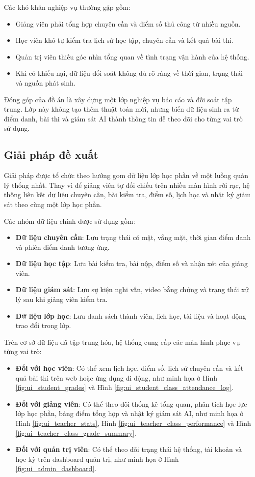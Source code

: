 \documentclass[../DoAn.tex]{subfiles}
\begin{document}
Các khó khăn nghiệp vụ thường gặp gồm:
\begin{itemize}
    \item Giảng viên phải tổng hợp chuyên cần và điểm số thủ công từ nhiều nguồn.
    \item Học viên khó tự kiểm tra lịch sử học tập, chuyên cần và kết quả bài thi.
    \item Quản trị viên thiếu góc nhìn tổng quan về tình trạng vận hành của hệ thống.
    \item Khi có khiếu nại, dữ liệu đối soát không đủ rõ ràng về thời gian, trạng thái và nguồn phát sinh.
\end{itemize}

Đóng góp của đồ án là xây dựng một lớp nghiệp vụ báo cáo và đối soát tập trung. Lớp này không tạo thêm thuật toán mới, nhưng biến dữ liệu sinh ra từ điểm danh, bài thi và giám sát AI thành thông tin dễ theo dõi cho từng vai trò sử dụng.

\subsection{Giải pháp đề xuất}
Giải pháp được tổ chức theo hướng gom dữ liệu lớp học phần về một luồng quản lý thống nhất. Thay vì để giảng viên tự đối chiếu trên nhiều màn hình rời rạc, hệ thống liên kết dữ liệu chuyên cần, bài kiểm tra, điểm số, lịch học và nhật ký giám sát theo cùng một lớp học phần.

Các nhóm dữ liệu chính được sử dụng gồm:
\begin{itemize}
    \item \textbf{Dữ liệu chuyên cần}: Lưu trạng thái có mặt, vắng mặt, thời gian điểm danh và phiên điểm danh tương ứng.
    \item \textbf{Dữ liệu học tập}: Lưu bài kiểm tra, bài nộp, điểm số và nhận xét của giảng viên.
    \item \textbf{Dữ liệu giám sát}: Lưu sự kiện nghi vấn, video bằng chứng và trạng thái xử lý sau khi giảng viên kiểm tra.
    \item \textbf{Dữ liệu lớp học}: Lưu danh sách thành viên, lịch học, tài liệu và hoạt động trao đổi trong lớp.
\end{itemize}

Trên cơ sở dữ liệu đã tập trung hóa, hệ thống cung cấp các màn hình phục vụ từng vai trò:
\begin{itemize}
    \item \textbf{Đối với học viên}: Có thể xem lịch học, điểm số, lịch sử chuyên cần và kết quả bài thi trên web hoặc ứng dụng di động, như minh họa ở Hình \ref{fig:ui_student_grades} và Hình \ref{fig:ui_student_class_attendance_log}.
    \item \textbf{Đối với giảng viên}: Có thể theo dõi thống kê tổng quan, phân tích học lực lớp học phần, bảng điểm tổng hợp và nhật ký giám sát AI, như minh họa ở Hình \ref{fig:ui_teacher_stats}, Hình \ref{fig:ui_teacher_class_performance} và Hình \ref{fig:ui_teacher_class_grade_summary}.
    \item \textbf{Đối với quản trị viên}: Có thể theo dõi trạng thái hệ thống, tài khoản và học kỳ trên dashboard quản trị, như minh họa ở Hình \ref{fig:ui_admin_dashboard}.
\end{itemize}
\end{document}
